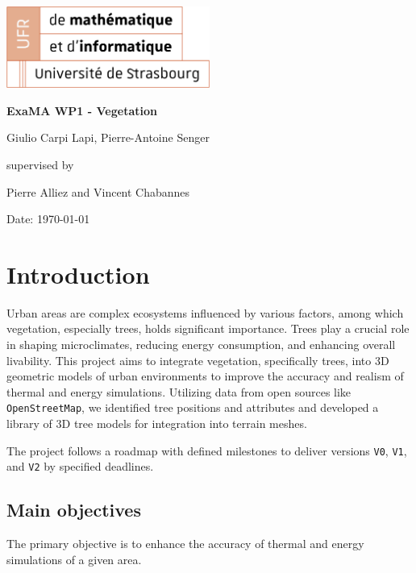 \documentclass[12pt]{article}
\begin{document}
\begin{titlepage}
\centering
\includegraphics[width=0.5\textwidth]{images/logo_ufr.png}\par\vspace{1cm}
\vspace{1.5cm}
{\huge\bfseries ExaMA WP1 - Vegetation\par}
\vspace{2cm}
{\Large Giulio Carpi Lapi, Pierre-Antoine Senger\par}
\vfill
supervised by\par
Pierre Alliez and Vincent Chabannes

\vfill

{\large Date: \today\par}
\end{titlepage}

\tableofcontents
\newpage

\section{Introduction}
Urban areas are complex ecosystems influenced by various factors, among which
vegetation, especially trees, holds significant importance. Trees play a crucial
role in shaping microclimates, reducing energy consumption, and enhancing overall
livability\cite{TIR4sTREEt}. This project aims to integrate vegetation, specifically trees, into 3D
geometric models of urban environments to improve the accuracy and realism of thermal
and energy simulations. Utilizing data from open sources like \texttt{OpenStreetMap},
we identified tree positions and attributes and developed a library of 3D tree
models for integration into terrain meshes.

The project follows a roadmap with defined milestones to deliver versions
\texttt{V0}, \texttt{V1}, and \texttt{V2} by specified  deadlines.

\subsection{Main objectives}

The primary objective is to enhance the accuracy of thermal and energy
simulations of a given area.
\end{document}
